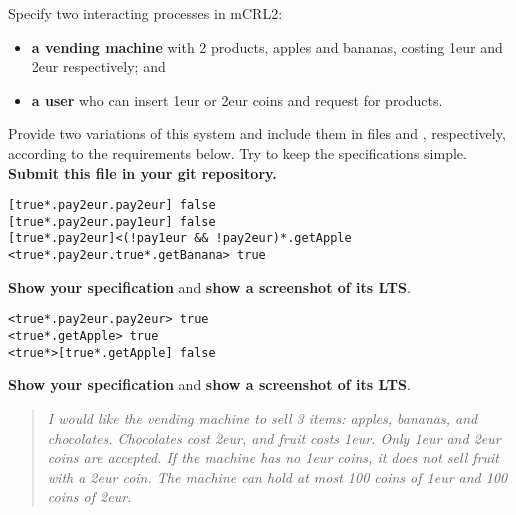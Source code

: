\documentclass[11pt]{article}
\begin{document}
\begin{myExercise} \label{ex:vm}
Specify two interacting processes in mCRL2:
\begin{itemize}
  \item \textbf{a vending machine} with 2 products, apples and bananas, costing 1eur and 2eur respectively; and
  \item \textbf{a user} who can insert 1eur or 2eur coins and request for products.
\end{itemize}
Provide two variations of this system and include them in files  and , respectively, according to the requirements below. Try to keep the specifications simple. \textbf{Submit this file in your git repository.}

\vspace{-6mm}
\begin{lstlisting}
[true*.pay2eur.pay2eur] false
[true*.pay2eur.pay1eur] false
[true*.pay2eur]<(!pay1eur && !pay2eur)*.getApple
<true*.pay2eur.true*.getBanana> true \end{lstlisting}
\textbf{Show your specification} and \textbf{show a screenshot of its LTS}.

\vspace{2mm}
\vspace{-6mm}
\begin{lstlisting}
<true*.pay2eur.pay2eur> true
<true*.getApple> true
<true*>[true*.getApple] false\end{lstlisting}
\textbf{Show your specification} and \textbf{show a screenshot of its LTS}.

\vspace{2mm}
\begin{quote}\it
  I would like the vending machine to sell 3 items: apples, bananas, and chocolates. Chocolates cost 2eur, and fruit costs 1eur. Only 1eur and 2eur coins are accepted. If the machine has no 1eur coins, it does not sell fruit with a 2eur coin. The machine can hold at most 100 coins of 1eur and 100 coins of 2eur.
\end{quote}
\end{myExercise}
\end{document}
